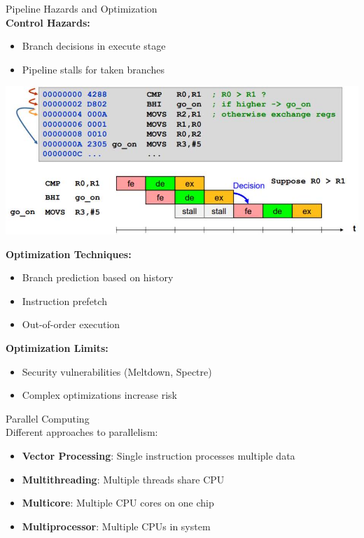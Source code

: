 \begin{concept}{Pipeline Hazards and Optimization}\\
\textbf{Control Hazards:}
\begin{itemize}
  \item Branch decisions in execute stage
  \item Pipeline stalls for taken branches
\end{itemize}

\includegraphics[width=\linewidth]{images/2024_12_29_79e6b22f503fb7b4f718g-15}

\textbf{Optimization Techniques:}
\begin{itemize}
  \item Branch prediction based on history
  \item Instruction prefetch
  \item Out-of-order execution
\end{itemize}

\textbf{Optimization Limits:}
\begin{itemize}
  \item Security vulnerabilities (Meltdown, Spectre)
  \item Complex optimizations increase risk
\end{itemize}
\end{concept}

\begin{concept}{Parallel Computing}\\
Different approaches to parallelism:
\begin{itemize}
  \item \textbf{Vector Processing}: Single instruction processes multiple data
  \item \textbf{Multithreading}: Multiple threads share CPU
  \item \textbf{Multicore}: Multiple CPU cores on one chip
  \item \textbf{Multiprocessor}: Multiple CPUs in system
\end{itemize}
\end{concept}

